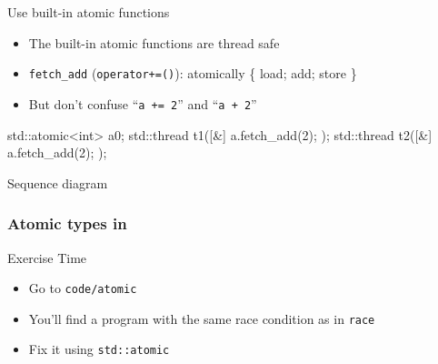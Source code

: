 \begin{frame}[fragile]
  \begin{block}{Use built-in atomic functions}
    \begin{itemize}
      \item The built-in atomic functions are thread safe
      \item \texttt{fetch\_add} (\texttt{operator+=()}): atomically \{ load; add; store \}
      \item But don't confuse ``\texttt{a += 2}'' and ``\texttt{a + 2}''
    \end{itemize}
  \end{block}
  \begin{exampleblock}{}
    \begin{cppcode*}{}
      std::atomic<int> a{0};
      std::thread t1([&]{ a.fetch_add(2); });
      std::thread t2([&]{ a.fetch_add(2); });
    \end{cppcode*}
  \end{exampleblock}
  \begin{block}{Sequence diagram}
  \end{block}
\end{frame}

\begin{frame}[fragile]
  \frametitle{Atomic types in \cpp}
  \begin{alertblock}{Exercise Time}
    \begin{itemize}
      \item Go to \texttt{code/atomic}
      \item You'll find a program with the same race condition as in \texttt{race}
      \item Fix it using \texttt{std::atomic}
    \end{itemize}
  \end{alertblock}
\end{frame}
